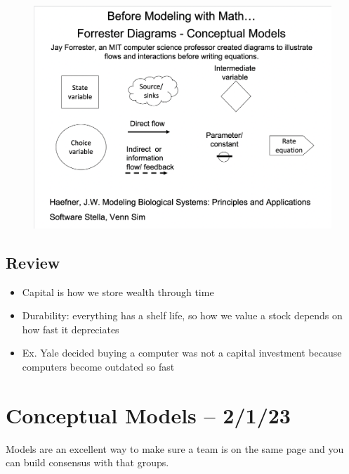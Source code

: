\documentclass{article}
\begin{document}
    \begin{figure}[htp]
        \centering
        \includegraphics[width=17cm]{forrester_diagrams.png}
        \caption{}
    \end{figure}


\subsection{Review}

\begin{itemize}
    \item Capital is how we store wealth through time 
    \item Durability: everything has a shelf life, so how we value a stock depends on how fast it depreciates 
    \item Ex. Yale decided buying a computer was not a capital investment because computers become outdated so fast 
\end{itemize}


\section{Conceptual Models -- 2/1/23}
Models are an excellent way to make sure a team is on the same page and you can build consensus with that groups. 
\end{document}
